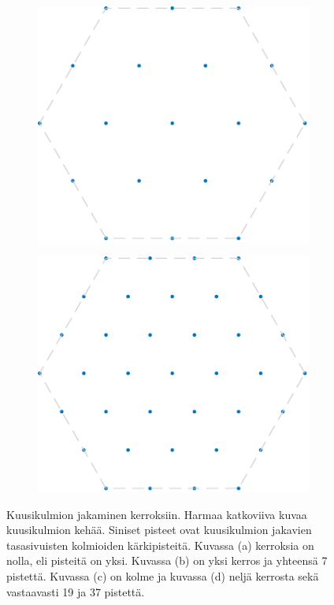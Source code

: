 \begin{figure}[H]
\begin{subfigure}[t]{.225\textwidth}
        \caption{}
    \end{subfigure}%
    \begin{subfigure}[t]{.225\textwidth}
        \includegraphics[width=.9\linewidth]{kuvat/6kulmio2.pdf}
        \caption{}
    \end{subfigure}%
    \begin{subfigure}[t]{.225\textwidth}
        \includegraphics[width=.9\linewidth]{kuvat/6kulmio3.pdf}
        \caption{}
    \end{subfigure}%
    \caption{Kuusikulmion jakaminen kerroksiin. Harmaa katkoviiva kuvaa kuusikulmion kehää. Siniset pisteet ovat kuusikulmion jakavien tasasivuisten kolmioiden kärkipisteitä. Kuvassa (a) kerroksia on nolla, eli pisteitä on yksi. Kuvassa (b) on yksi kerros ja yhteensä 7 pistettä. Kuvassa (c) on kolme ja kuvassa (d) neljä kerrosta sekä vastaavasti 19 ja 37 pistettä.}
    \label{fig:6kulmio}
\end{figure}

